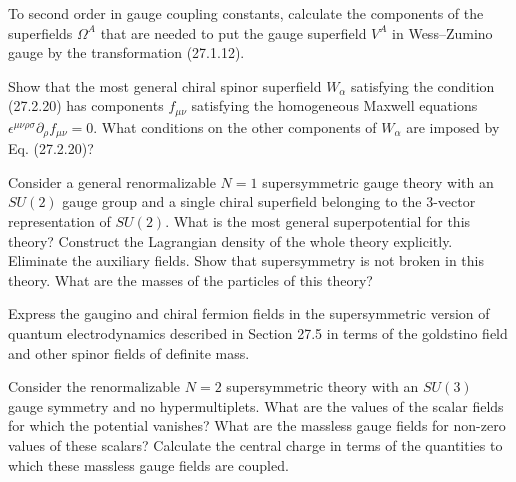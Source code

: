 
\begin{enumerate}
   To second order in gauge coupling constants, calculate the
  components of the superfields $\Omega^A$ that are needed to put the
  gauge superfield $V^A$ in Wess--Zumino gauge by the transformation
  (27.1.12).

   Show that the most general chiral spinor superfield $W_\alpha$
  satisfying the condition (27.2.20) has components $f_{\mu\nu}$
  satisfying the homogeneous Maxwell equations
  $\epsilon^{\mu\nu\rho\sigma}\partial_\rho f_{\mu\nu}=0$. What
  conditions on the other components of $W_\alpha$ are imposed by
  Eq. (27.2.20)?

   Consider a general renormalizable $N=1$ supersymmetric gauge
  theory with an $SU(2)$ gauge group and a single chiral superfield
  belonging to the 3-vector representation of $SU(2)$. What is the most
  general superpotential for this theory? Construct the Lagrangian
  density of the whole theory explicitly. Eliminate the auxiliary
  fields. Show that supersymmetry is not broken in this theory. What are
  the masses of the particles of this theory?

   Express the gaugino and chiral fermion fields in the
  supersymmetric version of quantum electrodynamics described in
  Section 27.5 in terms of the goldstino field and other spinor fields
  of definite mass.

   Consider the renormalizable $N=2$ supersymmetric theory with an
  $SU(3)$ gauge symmetry and no hypermultiplets. What are the values of
  the scalar fields for which the potential vanishes? What are the
  massless gauge fields for non-zero values of these scalars? Calculate
  the central charge in terms of the quantities to which these massless
  gauge fields are coupled.
\end{enumerate}
